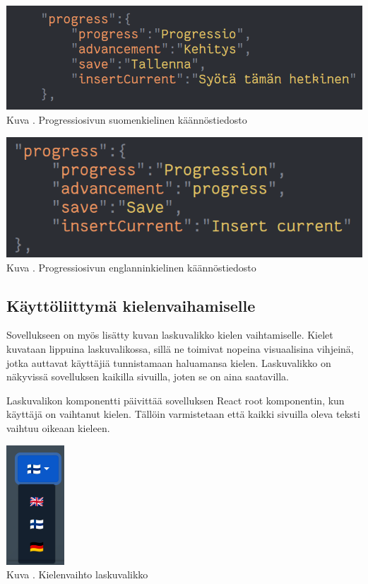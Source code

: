 \documentclass[11pt,a4paper,titlepage,oneside]{article}
\begin{document}
\bigskip
\includegraphics[width = 15cm]{src/public/oppar/translationfile.png}\\
Kuva \getImgCount. {} Progressiosivun suomenkielinen käännöstiedosto 
\medskip


\bigskip
\includegraphics[width = 15cm]{src/public/oppar/translationfileEng.png}\\
Kuva \getImgCount {}. Progressiosivun englanninkielinen käännöstiedosto
\medskip




\subsection{Käyttöliittymä kielenvaihamiselle}


Sovellukseen on myös lisätty kuvan \nextImageCount{} laskuvalikko kielen vaihtamiselle. 
Kielet kuvataan lippuina laskuvalikossa,
sillä ne toimivat nopeina visuaalisina vihjeinä, jotka auttavat käyttäjiä tunnistamaan haluamansa kielen.
Laskuvalikko on näkyvissä sovelluksen kaikilla sivuilla, joten se on aina saatavilla.
\medskip



Laskuvalikon komponentti päivittää sovelluksen React root komponentin, kun käyttäjä on vaihtanut kielen.
Tällöin varmistetaan että kaikki sivuilla oleva teksti vaihtuu oikeaan kieleen.
\medskip


\bigskip
\includegraphics[]{src/public/locale_laskuvalikko.png}\\
Kuva \getImgCount {}. Kielenvaihto laskuvalikko
\end{document}
